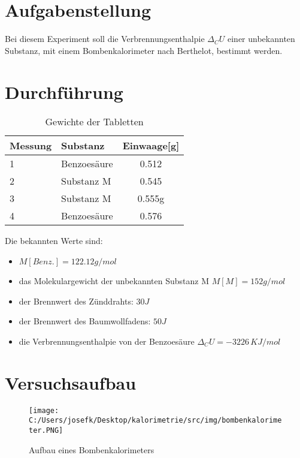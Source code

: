 \section{Aufgabenstellung}

Bei diesem Experiment soll die Verbrennungsenthalpie $\Delta _C U$ einer unbekannten Substanz, mit einem Bombenkalorimeter nach Berthelot, bestimmt werden.


\section{Durchführung}



\begin{table}[H]
	\centering
	\begin{tabular}{llc}
		\toprule
		Messung & Substanz    & Einwaage[g] \\
		\midrule
		1       & Benzoesäure & 0.512       \\
		2       & Substanz M  & 0.545       \\
		3       & Substanz M  & 0.555g      \\
		4       & Benzoesäure & 0.576       \\
		\bottomrule
	\end{tabular}
	\caption{Gewichte der Tabletten}
\end{table}

Die bekannten Werte sind:
\begin{itemize}
    \item $M[Benz.] = 122.12 g/mol$
    \item das Molekulargewicht der unbekannten Substanz M $M[M] = 152 g/mol$
    \item der Brennwert des Zünddrahts: $30 J$
    \item der Brennwert des Baumwollfadens: $50 J$
    \item die Verbrennungsenthalpie von der Benzoesäure $\Delta _C U = -3226 \, KJ/mol$
\end{itemize}

\section{Versuchsaufbau}

\begin{figure}[H]
    \texttt{[image: C:/Users/josefk/Desktop/kalorimetrie/src/img/bombenkalorimeter.PNG]}
    \caption{Aufbau eines Bombenkalorimeters}
\end{figure}




